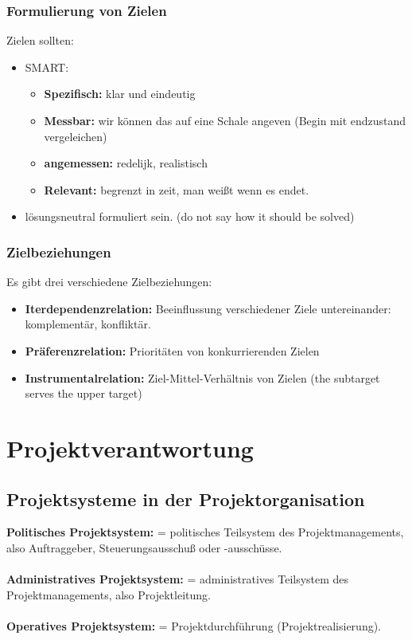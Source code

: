 \documentclass[11pt,a4paper]{article}
\begin{document}
\subsubsection{Formulierung von Zielen}
Zielen sollten:
\begin{itemize}
	\item SMART:
	\begin{itemize}
		\item \textbf{Spezifisch:} klar und eindeutig
		\item \textbf{Messbar:} wir können das auf eine Schale angeven (Begin mit endzustand vergeleichen)
		\item \textbf{angemessen:} redelijk, realistisch
		\item \textbf{Relevant:}  begrenzt in zeit, man weißt wenn es endet.
	\end{itemize}
	\item lösungsneutral formuliert sein. (do not say how it should be solved)
\end{itemize}

\subsubsection{Zielbeziehungen}

Es gibt drei verschiedene Zielbeziehungen:
\begin{itemize}
\item \textbf{Iterdependenzrelation:} Beeinflussung verschiedener Ziele untereinander: komplementär, konfliktär.
\item \textbf{Präferenzrelation:} Prioritäten von
konkurrierenden Zielen
\item \textbf{Instrumentalrelation:} Ziel-Mittel-Verhältnis von Zielen (the subtarget serves the upper target)
\end{itemize}

\section{Projektverantwortung}

\subsection{Projektsysteme in der Projektorganisation}
\textbf{Politisches Projektsystem:} = politisches Teilsystem des Projektmanagements, also Auftraggeber,
Steuerungsausschuß oder -ausschüsse.
\\
\\
\textbf{Administratives Projektsystem:} = administratives Teilsystem des Projektmanagements, also Projektleitung.
\\
\\
\textbf{Operatives Projektsystem:} = Projektdurchführung (Projektrealisierung).
\end{document}
